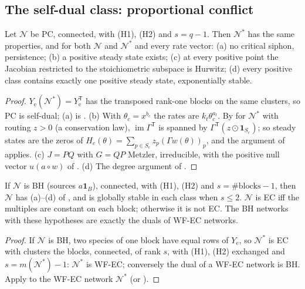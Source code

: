 \documentclass[11pt,a4paper]{report}
\newcommand{\Net}{\mathcal{N}}
\newcommand{\Nd}{\mathcal{N}^{*}}
\newcommand{\Ye}{Y_{\mathrm e}}
\newcommand{\im}{\operatorname{im}}
\newcommand{\tp}{^{\mathsf T}}
\begin{document}
\subsection{The self-dual class: proportional conflict}

\begin{theorem}[agent Q3]\label{thm:PC}
Let \(\Net\) be PC, connected, with (H1), (H2) and \(s=q-1\). Then \(\Nd\) has the same properties, and for both
\(\Net\) and \(\Nd\) and every rate vector: (a) no critical siphon, persistence; (b) a positive steady state exists;
(c) at every positive point the Jacobian restricted to the stoichiometric subspace is Hurwitz; (d) every positive
class contains exactly one positive steady state, exponentially stable.
\end{theorem}
\begin{proof}
\(\Ye(\Nd)=\Ye\tp\) has the transposed rank-one blocks on the same clusters, so PC is self-dual; (a) is
. (b) With \(\theta_c=x^{b_c}\) the rates are \(k_t\theta_c^{a_t}\). By  for \(\Nd\) with
routing \(z>0\) (a conservation law), \(\im\Gamma\tp\) is spanned by \(\Gamma\tp(z\odot\mathbf 1_{S_c})\); so steady states
are the zeros of \(H_c(\theta)=\sum_{p\in S_c}z_p(\Gamma w(\theta))_p\), and the argument of  applies.
(c) \(J=PQ\) with \(G=QP\) Metzler, irreducible, with the positive null vector \(u(a\circ w)\) of . (d) The
degree argument of .
\end{proof}

\begin{corollary}\label{cor:BH}
If \(\Net\) is BH (sources \(a\mathbf 1_B\)), connected, with (H1), (H2) and \(s=\#\text{blocks}-1\), then \(\Net\) has
(a)--(d) of , and is globally stable in each class when \(s\le2\). \(\Net\) is EC iff the multiples are
constant on each block; otherwise it is not EC. The BH networks with these hypotheses are exactly the duals of WF-EC
networks.
\end{corollary}
\begin{proof}
If \(\Net\) is BH, two species of one block have equal rows of \(\Ye\), so \(\Nd\) is EC with clusters the blocks,
connected, of rank \(s\), with (H1), (H2) exchanged and \(s=m(\Nd)-1\): \(\Nd\) is WF-EC; conversely the dual of a WF-EC
network is BH. Apply  to the WF-EC network \(\Nd\) (or ).
\end{proof}
\end{document}
